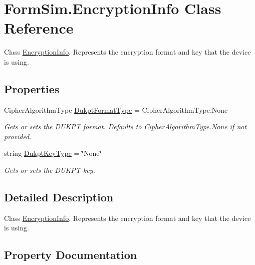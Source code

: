 \hypertarget{class_form_sim_1_1_encryption_info}{}\section{Form\+Sim.\+Encryption\+Info Class Reference}
\label{class_form_sim_1_1_encryption_info}


Class \mbox{\hyperlink{class_form_sim_1_1_encryption_info}{Encryption\+Info}}. Represents the encryption format and key that the device is using.  


\subsection*{Properties}
\begin{DoxyCompactItemize}
\item 
Cipher\+Algorithm\+Type \mbox{\hyperlink{class_form_sim_1_1_encryption_info_aea30c1ce04ab486c20c6ea904c6948c5}{Dukpt\+Format\+Type}} = Cipher\+Algorithm\+Type.\+None
\begin{DoxyCompactList}\small\item\em Gets or sets the D\+U\+K\+PT format. Defaults to Cipher\+Algorithm\+Type.\+None if not provided. \end{DoxyCompactList}\item 
string \mbox{\hyperlink{class_form_sim_1_1_encryption_info_ac02bcaed68e7b3995102172b8f9d2d7b}{Dukpt\+Key\+Type}} = \char`\"{}None\char`\"{}
\begin{DoxyCompactList}\small\item\em Gets or sets the D\+U\+K\+PT key. \end{DoxyCompactList}\end{DoxyCompactItemize}


\subsection{Detailed Description}
Class \mbox{\hyperlink{class_form_sim_1_1_encryption_info}{Encryption\+Info}}. Represents the encryption format and key that the device is using. 



\subsection{Property Documentation}
\mbox{\label{class_form_sim_1_1_encryption_info_aea30c1ce04ab486c20c6ea904c6948c5}} 
